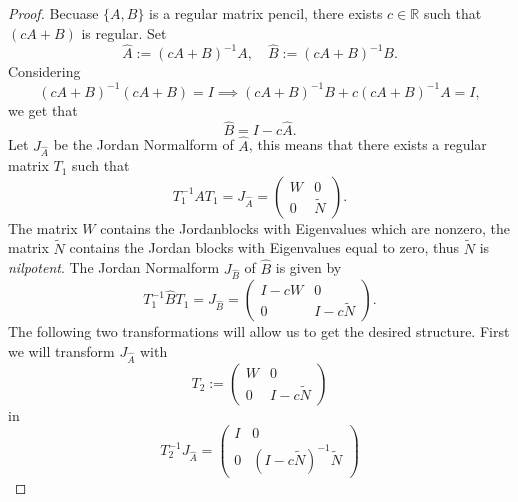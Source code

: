 \begin{proof}
	Becuase $\{A,B\}$ is a regular matrix pencil, there exists $c \in \mathbb{R}$ such that $(cA+B)$ is regular. Set
	\begin{displaymath}
		\hat{A} := (cA+B)^{-1}A, \quad \hat{B} := (cA+B)^{-1}B.
	\end{displaymath}
	Considering 
	\begin{displaymath}
		(cA+B)^{-1}(cA+B) = I \implies (cA+B)^{-1}B+c(cA+B)^{-1}A = I ,
	\end{displaymath}
	we get that
	\begin{displaymath}
		\hat{B} = I-c \hat{A} .
	\end{displaymath}
	Let $J_ {\hat{A}}$ be the Jordan Normalform of $\hat{A}$, this means that there exists a regular matrix $T_1$ such that
	\begin{displaymath}
		T_1^{-1}AT_1 = J_{\hat{A}} =
		\left(
		\begin{matrix}
			W & 0 \\
			0 & \tilde{N} 
		\end{matrix}
		\right) .
	\end{displaymath}
	The matrix $W$ contains the Jordanblocks with Eigenvalues which are nonzero, the matrix $\tilde{N}$ contains the Jordan blocks with Eigenvalues equal to zero, thus $\tilde{N}$ is \emph{nilpotent}.
	The Jordan Normalform $J_{\hat{B}}$ of $\hat{B}$ is given by
	\begin{displaymath}
		T_1^{-1} \hat{B} T_1 = J_{\hat{B}} = 
		\left(
		\begin{matrix}
			I-cW & 0 \\
			0 & I-c\tilde{N}
		\end{matrix}
		\right) .
	\end{displaymath}
	The following two transformations will allow us to get the desired structure.
	First we will transform $J_{\hat{A}}$ with
	\begin{displaymath}
		T_2 :=
		\left(
		\begin{matrix}
			W & 0 \\
			0 & I-c\tilde{N}
		\end{matrix}
		\right)
	\end{displaymath}
	in
	\begin{displaymath}
		T_2^{-1}J_{\hat{A}} = 
		\left(
		\begin{matrix}
			I & 0 \\
			0 & (I-c\tilde{N})^{-1}\tilde{N}
		\end{matrix}
		\right)
	\end{displaymath}

\end{proof}
